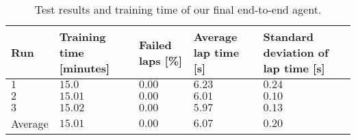 \begin{table}[!htb]
\centering
\small
\begin{tabularx}{\textwidth}{RLLLL} 
    \hline
    \textbf{Run} & \textbf{Training time [minutes]} & \textbf{Failed laps [\%]} & \textbf{Average lap time [s]} & \textbf{Standard deviation of lap time [s]}\\ 
    \hline
    $1$     & $15.0$     & $0.00$    & $6.23$    & $0.24$ \\      
    $2$     & $15.01$    & $0.00$    & $6.01$    & $0.10$ \\
    $3$     & $15.02$    & $0.00$    & $5.97$    & $0.13$ \\
    Average & $15.01$    & $0.00$    & $6.07$    & $0.20$ \\
    \hline
\end{tabularx}
\caption[Test results of our final end-to-end agent]{Test results and training time of our final end-to-end agent.}
\label{tab:end_to_end_results}
\end{table}
